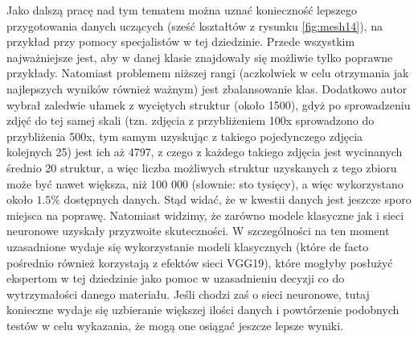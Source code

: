 Jako dalszą pracę nad tym tematem można uznać konieczność lepszego przygotowania danych uczących (sześć kształtów z rysunku \ref{fig:mesh14}), na przykład przy pomocy specjalistów w tej dziedzinie. Przede wszystkim najważniejsze jest, aby w danej klasie znajdowały się możliwie tylko poprawne przykłady. Natomiast problemem niższej rangi (aczkolwiek w celu otrzymania jak najlepszych wyników również ważnym) jest zbalansowanie klas. Dodatkowo autor wybrał zaledwie ułamek z wyciętych struktur (około 1500), gdyż po sprowadzeniu zdjęć do tej samej skali (tzn. zdjęcia z przybliżeniem 100x sprowadzono do przybliżenia 500x, tym samym uzyskując z takiego pojedynczego zdjęcia kolejnych 25) jest ich aż 4797, z czego z każdego takiego zdjęcia jest wycinanych średnio 20 struktur, a więc liczba możliwych struktur uzyskanych z tego zbioru może być nawet większa, niż 100 000 (słownie: sto tysięcy), a więc wykorzystano około $1.5\%$ dostępnych danych. Stąd widać, że w kwestii danych jest jeszcze sporo miejsca na poprawę. Natomiast widzimy, że zarówno modele klasyczne jak i sieci neuronowe uzyskały przyzwoite skuteczności. W szczególności na ten moment uzasadnione wydaje się wykorzystanie modeli klasycznych (które de facto pośrednio również korzystają z efektów sieci VGG19), które mogłyby posłużyć ekspertom w tej dziedzinie jako pomoc w uzasadnieniu decyzji co do wytrzymałości danego materiału. Jeśli chodzi zaś o sieci neuronowe, tutaj konieczne wydaje się uzbieranie większej ilości danych i powtórzenie podobnych testów w celu wykazania, że mogą one osiągać jeszcze lepsze wyniki. 